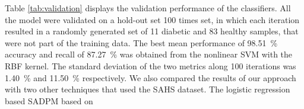 \documentclass[journal,comsoc]{IEEEtran}
\renewcommand{\^}{\hat}  %
\begin{document}
Table \ref{tab:validation} displays the validation performance of the classifiers. All the model were validated on a hold-out set \num{100} times set, in which each iteration resulted in a randomly generated set of \num{11} diabetic and \num{83} healthy samples, that were not part of the training data. The best mean performance of \SI{98.51}{\percent} accuracy and  recall of \SI{87.27}{\percent} was obtained from the nonlinear SVM with the RBF kernel. The standard deviation of the two metrics along \num{100} iterations was \SI{1.40}{\percent} and \SI{11.50}{\percent} respectively. We also compared the results of our approach with two other techniques that used the SAHS dataset. The logistic regression based SADPM based on
%
%
%
\end{document}
